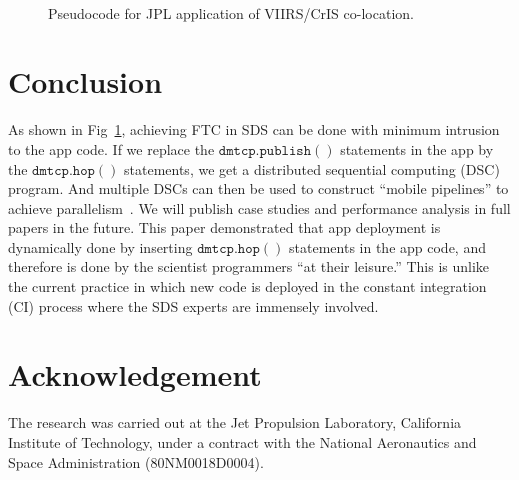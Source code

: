 \documentclass[conference]{IEEEtran}
\begin{document}
\begin{figure}[!ht]
\begin{center}
\begin{center}
\mbox{}\\[0.3em]
\end{center}
\hspace{\fill}%
\caption{Pseudocode for JPL application of VIIRS/CrIS co-location.}
\label{code:app}
\end{center}
\end{figure}


\section{Conclusion}
\label{sec:conclusion}

As shown in Fig~\ref{code:app}, achieving FTC in SDS can be done with minimum intrusion to the app code.
If we replace the $\mathtt{dmtcp.publish()}$ statements in the app by the $\mathtt{dmtcp.hop()}$ statements, we get a distributed sequential computing (DSC) program. And multiple DSCs can then be used to construct ``mobile pipelines'' to achieve parallelism~\cite{pan2004navp}. We will publish case studies and performance analysis in full papers in the future. This paper demonstrated that app deployment is dynamically done by inserting $\mathtt{dmtcp.hop()}$ statements in the app code, and therefore is done by the scientist programmers ``at their leisure.'' This is unlike the current practice in which new code is deployed in the constant integration (CI) process where the SDS experts are immensely involved.

\section*{Acknowledgement}
The research was carried out at the Jet Propulsion Laboratory, California Institute of Technology, under a contract with the National Aeronautics and Space Administration (80NM0018D0004).



\end{document}
